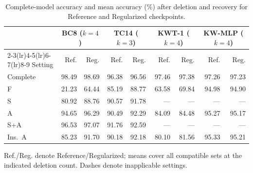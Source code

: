\begin{table}
\caption{Complete-model accuracy and mean accuracy (\%) after deletion
and recovery for Reference and Regularized checkpoints.}
\label{tab:regularization_comparison}
\centering\small
\setlength{\tabcolsep}{4pt}
\begin{tabular}{lrrrrrrrr}
\toprule
 & \multicolumn{2}{c}{BC8 ($k=4$)} & \multicolumn{2}{c}{TC14 ($k=3$)}
 & \multicolumn{2}{c}{KWT-1 ($k=4$)} & \multicolumn{2}{c}{KW-MLP ($k=4$)} \\
\cmidrule(lr){2-3}\cmidrule(lr){4-5}\cmidrule(lr){6-7}\cmidrule(lr){8-9}
Setting & Ref. & Reg. & Ref. & Reg. & Ref. & Reg. & Ref. & Reg. \\
\midrule
Complete & 98.49 & 98.69 & 96.38 & 96.56 & 97.46 & 97.38 & 97.26 & 97.23 \\
F & 21.23 & 64.44 & 85.19 & 88.77 & 63.58 & 69.84 & 94.98 & 94.90 \\
\midrule
S & 80.92 & 88.76 & 90.57 & 91.78 & --- & --- & --- & --- \\
A & 94.65 & 96.29 & 90.49 & 92.29 & 84.09 & 84.48 & 95.27 & 95.17 \\
S+A & 96.53 & 97.07 & 91.76 & 92.59 & --- & --- & --- & --- \\
\midrule
Ins.\ A & 85.23 & 91.70 & 90.18 & 92.18 & 80.10 & 81.56 & 95.33 & 95.21 \\
\bottomrule
\end{tabular}
\par\smallskip\begin{minipage}{\linewidth}\footnotesize
Ref./Reg. denote Reference/Regularized; means cover all compatible sets at the indicated deletion count. Dashes denote inapplicable settings.
\end{minipage}
\end{table}
